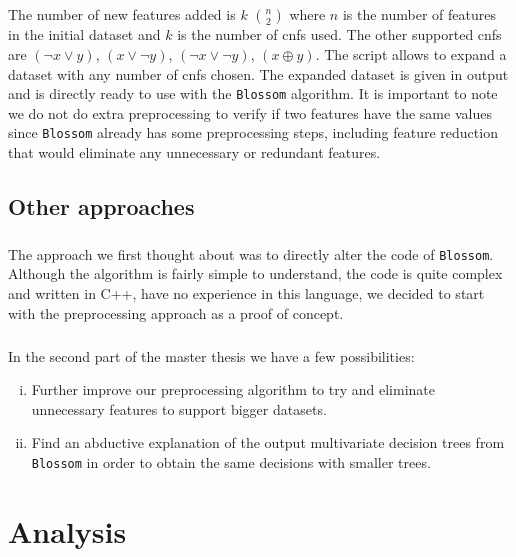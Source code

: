 \documentclass[12pt]{report}
\theoremstyle{definition}
\theoremstyle{definition}
\theoremstyle{definition}
\begin{document}
\paragraph{} The number of new features added is $k$ $n \choose 2$ where $n$ is the number of features in
the initial dataset and $k$ is the number of cnfs used. The other supported cnfs are $(\neg x \lor y)$,
$(x \lor \neg y)$, $(\neg x \lor \neg y)$, $(x \oplus y)$. The script allows to expand a dataset with any number
of cnfs chosen. The expanded dataset is given in output and is directly ready to use with the \texttt{Blossom} algorithm.
It is important to note we do not do extra preprocessing to verify if two features have the same values since
\texttt{Blossom} already has some preprocessing steps, including feature reduction that would eliminate any unnecessary or
redundant features.


\section{Other approaches}
\paragraph{} The approach we first thought about was to directly alter the code of \texttt{Blossom}. Although the
algorithm is fairly simple to understand, the code is quite complex and written in C++, have no experience in
this language, we decided to start with the preprocessing approach as a proof of concept.

\paragraph{} In the second part of the master thesis we have a few possibilities:

\begin{enumerate}[(i)]
    \item Further improve our preprocessing algorithm to try and eliminate unnecessary features to support bigger
    datasets.
    \item Find an abductive explanation \cite{multivariate-explaining} of the output multivariate decision trees
    from \texttt{Blossom} in order to obtain the same decisions with smaller trees.
\end{enumerate}



\chapter{Analysis}
\end{document}
